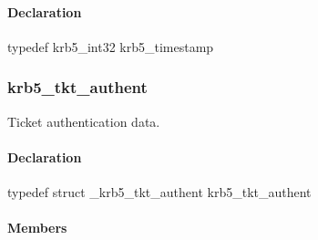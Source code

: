 \documentclass[letterpaper,10pt,english]{sphinxmanual}
\begin{document}
\begin{fulllineitems}
\label{appdev/refs/types/krb5_timestamp:c.krb5_timestamp}
\end{fulllineitems}



\paragraph{Declaration}
\label{appdev/refs/types/krb5_timestamp:declaration}
typedef krb5\_int32 krb5\_timestamp


\subsubsection{krb5\_tkt\_authent}
\label{appdev/refs/types/krb5_tkt_authent:krb5-tkt-authent}\label{appdev/refs/types/krb5_tkt_authent:krb5-tkt-authent-struct}\label{appdev/refs/types/krb5_tkt_authent::doc}

\begin{fulllineitems}
\label{appdev/refs/types/krb5_tkt_authent:c.krb5_tkt_authent}
\end{fulllineitems}


Ticket authentication data.


\paragraph{Declaration}
\label{appdev/refs/types/krb5_tkt_authent:declaration}
typedef struct \_krb5\_tkt\_authent  krb5\_tkt\_authent


\paragraph{Members}
\label{appdev/refs/types/krb5_tkt_authent:members}

\begin{fulllineitems}
\label{appdev/refs/types/krb5_tkt_authent:c.krb5_tkt_authent.magic}
\end{fulllineitems}


\begin{fulllineitems}
\label{appdev/refs/types/krb5_tkt_authent:c.krb5_tkt_authent.ticket}
\end{fulllineitems}
\end{document}
